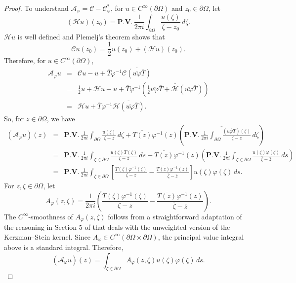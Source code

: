 \documentclass[11pt, reqno]{amsart}
\numberwithin{equation}{section}
\begin{document}
\begin{proof}
To understand $\mathcal{A}_{\varphi}=\mathcal{C}-\mathcal{C}^*_{\varphi}$, for $u\in C^{\infty}(\partial\Omega)$ and $z_0\in\partial\Omega$, let
\[
(\mathcal{H}u)(z_0) = \textbf{P.V.}\,\frac{1}{2\pi i}\int_{\partial\Omega} \frac{u(\zeta)}{\zeta-z_0}\,d\zeta.
\]
$\mathcal{H}u$ is well defined and Plemelj's theorem shows that
\[
\mathcal{C}u(z_0)=\frac{1}{2}u(z_0) + (\mathcal{H}u)(z_0).
\]
Therefore, for $u\in C^{\infty}(\partial\Omega)$,
\begin{eqnarray*}
\mathcal{A}_{\varphi}u &=& \mathcal{C}u-u+\overline{T}\varphi^{-1}\overline{\mathcal{C}(\overline{u\varphi}\overline{T})}
\\
&=& \frac{1}{2}u + \mathcal{H}u-u+\overline{T}\varphi^{-1}\left(\overline{\frac{1}{2}\overline{u\varphi}\overline{T}+\mathcal{H}(\overline{u\varphi}\overline{T})}\right)
\\
&=& \mathcal{H}u + \overline{T}\varphi^{-1}\overline{\mathcal{H}(\overline{u\varphi}\overline{T})}.
\end{eqnarray*}
So, for $z\in\partial\Omega$, we have
\begin{eqnarray*}
(\mathcal{A}_{\varphi}u)(z) &=& \textbf{P.V.}\,\frac{1}{2\pi i}\int_{\partial\Omega} \frac{u(\zeta)}{\zeta-z}\,d\zeta + \overline{T(z)}\varphi^{-1}(z)\left(\overline{\textbf{P.V.}\,\frac{1}{2\pi i}\int_{\partial\Omega} \frac{(\overline{u\varphi T})(\zeta)}{\zeta-z}\,d\zeta}\right)
\\
&=& \textbf{P.V.}\,\frac{1}{2\pi i}\int_{\zeta\in\partial\Omega} \frac{u(\zeta)T(\zeta)}{\zeta-z}\,ds - \overline{T(z)}\varphi^{-1}(z) \left(\textbf{P.V.}\,\frac{1}{2\pi i}\int_{\zeta\in\partial\Omega} \frac{u(\zeta)\varphi(\zeta)}{\bar{\zeta}-\bar{z}}\,ds\right)
\\
&=& \textbf{P.V.}\,\frac{1}{2\pi i}\int_{\zeta\in\partial\Omega}\left[\frac{T(\zeta)\varphi^{-1}(\zeta)}{\zeta-z}-\frac{\overline{T(z)}\varphi^{-1}(z)}{\bar{\zeta}-\bar{z}}\right]u(\zeta)\varphi(\zeta)\,ds.
\end{eqnarray*}
For $z,\zeta\in\partial\Omega$, let
\[
A_{\varphi}(z,\zeta)=\frac{1}{2\pi i}\left(\frac{T(\zeta)\varphi^{-1}(\zeta)}{\zeta-z}-\frac{\overline{T(z)}\varphi^{-1}(z)}{\bar{\zeta}-\bar{z}}\right).
\]
The $C^{\infty}$-smoothness of $A_{\varphi}(z,\zeta)$ follows from a straightforward adaptation of the reasoning in Section $5$ of \cite{Be0} that deals with the unweighted version of the Kerzman--Stein kernel. Since $A_{\varphi}\in C^{\infty}(\partial\Omega\times\partial\Omega)$, the principal value integral above is a standard integral. Therefore,
\[
(\mathcal{A}_{\varphi}u)(z)=\int_{\zeta\in\partial\Omega} A_{\varphi}(z,\zeta) u(\zeta)\varphi(\zeta)\,ds.
\]
\end{proof}
\end{document}
